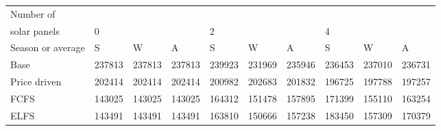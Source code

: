 \begin{table}[h] 
\centering 
\begin{tabular}{l|lll|lll|lll}Number of \\ solar panels&0& & &2& & &4& & \\ \hline 
Season or average & S & W & A & S & W & A & S & W & A \\ \hline 
Base&237813&237813&237813&239923&231969&235946&236453&237010&236731 \\ 
Price driven&202414&202414&202414&200982&202683&201832&196725&197788&197257 \\ 
FCFS&143025&143025&143025&164312&151478&157895&171399&155110&163254 \\ 
ELFS&143491&143491&143491&163810&150666&157238&183450&157309&170379 \\ 
\end{tabular} 
\end{table}